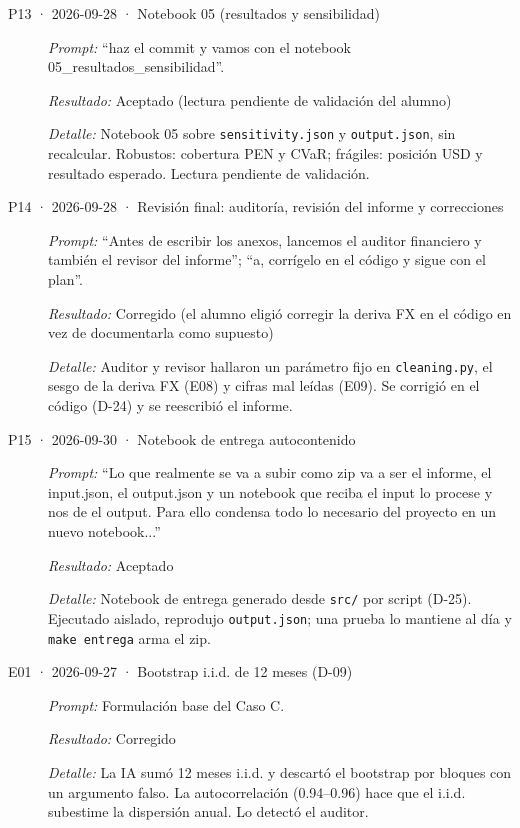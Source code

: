 \begin{description}
\item[P13 · 2026-09-28 · Notebook 05 (resultados y sensibilidad)] \mbox{}\par
\textit{Prompt:} \enquote{haz el commit y vamos con el notebook 05\_resultados\_sensibilidad}.\par
\textit{Resultado:} Aceptado (lectura pendiente de validación del alumno)\par
\textit{Detalle:} Notebook 05 sobre \texttt{sensitivity.json} y \texttt{output.json}, sin recalcular. Robustos: cobertura PEN y CVaR; frágiles: posición USD y resultado esperado. Lectura pendiente de validación.\par
\item[P14 · 2026-09-28 · Revisión final: auditoría, revisión del informe y correcciones] \mbox{}\par
\textit{Prompt:} \enquote{Antes de escribir los anexos, lancemos el auditor financiero y también el revisor del informe}; \enquote{a, corrígelo en el código y sigue con el plan}.\par
\textit{Resultado:} Corregido (el alumno eligió corregir la deriva FX en el código en vez de documentarla como supuesto)\par
\textit{Detalle:} Auditor y revisor hallaron un parámetro fijo en \texttt{cleaning.py}, el sesgo de la deriva FX (E08) y cifras mal leídas (E09). Se corrigió en el código (D-24) y se reescribió el informe.\par
\item[P15 · 2026-09-30 · Notebook de entrega autocontenido] \mbox{}\par
\textit{Prompt:} \enquote{Lo que realmente se va a subir como zip va a ser el informe, el input.json, el output.json y un notebook que reciba el input lo procese y nos de el output. Para ello condensa todo lo necesario del proyecto en un nuevo notebook...}\par
\textit{Resultado:} Aceptado\par
\textit{Detalle:} Notebook de entrega generado desde \texttt{src/} por script (D-25). Ejecutado aislado, reprodujo \texttt{output.json}; una prueba lo mantiene al día y \texttt{make entrega} arma el zip.\par
\item[E01 · 2026-09-27 · Bootstrap i.i.d. de 12 meses (D-09)] \mbox{}\par
\textit{Prompt:} Formulación base del Caso C.\par
\textit{Resultado:} Corregido\par
\textit{Detalle:} La IA sumó 12 meses i.i.d. y descartó el bootstrap por bloques con un argumento falso. La autocorrelación (0.94–0.96) hace que el i.i.d. subestime la dispersión anual. Lo detectó el auditor.\par

\end{description}
